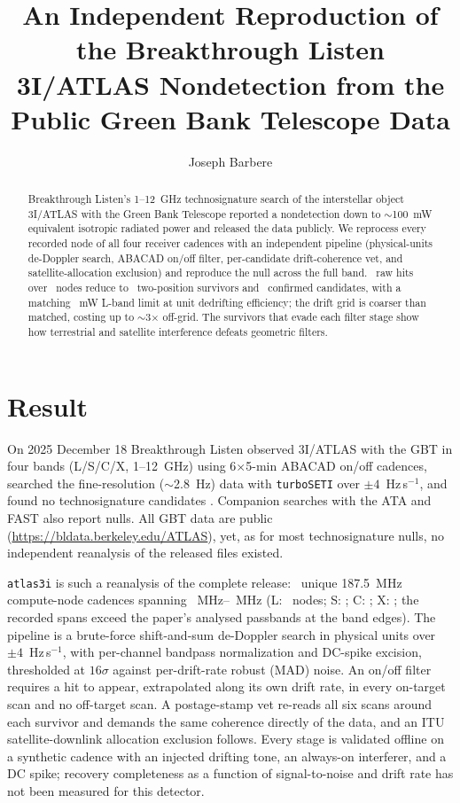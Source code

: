 \documentclass[RNAAS]{aastex631}
\newcommand{\code}[1]{\texttt{#1}}
\begin{document}
\title{An Independent Reproduction of the Breakthrough Listen 3I/ATLAS
Nondetection from the Public Green Bank Telescope Data}

\author[0009-0008-3289-4447]{Joseph Barbere}

\begin{abstract}
Breakthrough Listen's 1--12~GHz technosignature search of the interstellar object
3I/ATLAS with the Green Bank Telescope reported a nondetection down to $\sim$100~mW
equivalent isotropic radiated power \citep{jacobsonbell2025} and released the data
publicly. We reprocess every recorded node of all four receiver cadences with an
independent pipeline (physical-units de-Doppler search, ABACAD on/off filter,
per-candidate drift-coherence vet, and satellite-allocation exclusion) and reproduce
the null across the full band. \aiTotRawHits\ raw hits over \aiTotNodes\ nodes reduce
to \aiTotSurvivors\ two-position survivors and \aiTotConfirmed\ confirmed candidates,
with a matching \aiEirpMw~mW L-band limit at unit dedrifting efficiency; the drift
grid is coarser than matched, costing up to $\sim$3$\times$ off-grid. The survivors
that evade each filter stage show how terrestrial and satellite interference defeats
geometric filters.
\end{abstract}

\section{Result}

On 2025 December 18 Breakthrough Listen observed 3I/ATLAS with the GBT in four bands
(L/S/C/X, 1--12~GHz) using 6$\times$5-min ABACAD on/off cadences, searched the
fine-resolution ($\sim$2.8~Hz) data with \code{turboSETI} over $\pm4$~Hz\,s$^{-1}$, and
found no technosignature candidates \citep{jacobsonbell2025}. Companion searches with
the ATA \citep{ata3i} and FAST \citep{fast3i} also report nulls. All GBT data are public
(\url{https://bldata.berkeley.edu/ATLAS}), yet, as for most technosignature nulls, no
independent reanalysis of the released files existed.

\code{atlas3i} \citep{janskyresearch} is such a reanalysis of the complete release:
\aiTotNodes\ unique 187.5~MHz compute-node cadences spanning
\aiLBandLo~MHz--\aiXBandHi~MHz (L: \aiLNodes\ nodes; S: \aiSNodes; C: \aiCNodes;
X: \aiXNodes; the recorded spans exceed the paper's analysed passbands at the band
edges). The pipeline is a brute-force shift-and-sum de-Doppler search in physical units over
$\pm4$~Hz\,s$^{-1}$, with per-channel bandpass normalization and DC-spike excision,
thresholded at $16\sigma$ against per-drift-rate robust (MAD) noise. An on/off filter
requires a hit to appear, extrapolated along its own drift rate, in every on-target
scan and no off-target scan. A postage-stamp vet re-reads all six scans around each
survivor and demands the same coherence directly of the data, and an ITU
satellite-downlink allocation exclusion follows. Every stage is validated offline on a
synthetic cadence with an injected drifting tone, an always-on interferer, and a DC
spike; recovery completeness as a function of signal-to-noise and drift rate has not been
measured for this detector.
\end{document}
